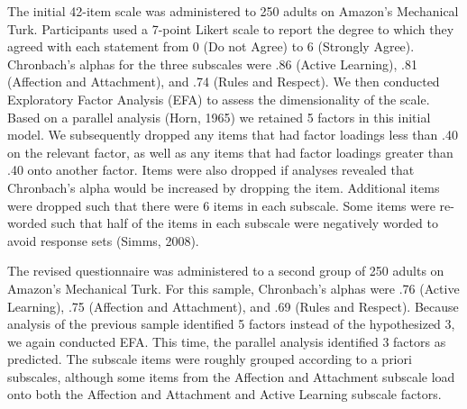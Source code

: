 \documentclass[10pt, letterpaper]{article}
\begin{document}
The initial 42-item scale was administered to 250 adults on Amazon's
Mechanical Turk. Participants used a 7-point Likert scale to report the
degree to which they agreed with each statement from 0 (Do not Agree) to
6 (Strongly Agree). Chronbach's alphas for the three subscales were .86
(Active Learning), .81 (Affection and Attachment), and .74 (Rules and
Respect). We then conducted Exploratory Factor Analysis (EFA) to assess
the dimensionality of the scale. Based on a parallel analysis (Horn,
1965) we retained 5 factors in this initial model. We subsequently
dropped any items that had factor loadings less than .40 on the relevant
factor, as well as any items that had factor loadings greater than .40
onto another factor. Items were also dropped if analyses revealed that
Chronbach's alpha would be increased by dropping the item. Additional
items were dropped such that there were 6 items in each subscale. Some
items were re-worded such that half of the items in each subscale were
negatively worded to avoid response sets (Simms, 2008).

The revised questionnaire was administered to a second group of 250
adults on Amazon's Mechanical Turk. For this sample, Chronbach's alphas
were .76 (Active Learning), .75 (Affection and Attachment), and .69
(Rules and Respect). Because analysis of the previous sample identified
5 factors instead of the hypothesized 3, we again conducted EFA. This
time, the parallel analysis identified 3 factors as predicted. The
subscale items were roughly grouped according to a priori subscales,
although some items from the Affection and Attachment subscale load onto
both the Affection and Attachment and Active Learning subscale factors.
\end{document}

